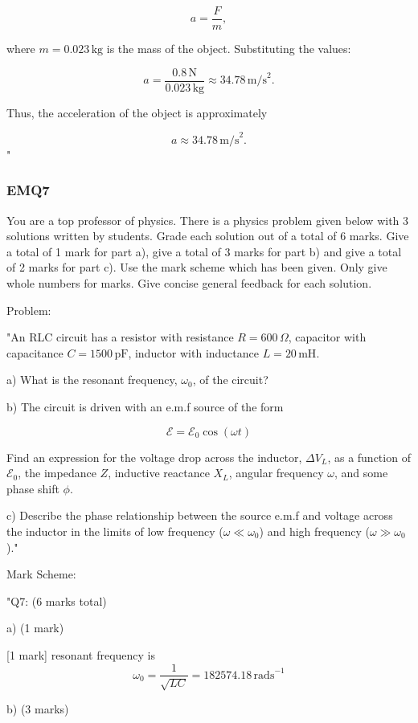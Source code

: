 \[
a = \frac{F}{m},
\]

where $m = 0.023 \, \text{kg}$ is the mass of the object. Substituting the values:

\[
a = \frac{0.8 \, \text{N}}{0.023 \, \text{kg}} \approx 34.78 \, \text{m/s}^2.
\]

Thus, the acceleration of the object is approximately

\[
a \approx 34.78 \, \text{m/s}^2.
\]"

\subsubsection{EMQ7}

You are a top professor of physics. There is a physics problem given below with 3 solutions written by students. Grade each solution out of a total of 6 marks. Give a total of 1 mark for part a), give a total of 3 marks for part b) and give a total of 2 marks for part c). Use the mark scheme which has been given. Only give whole numbers for marks. Give concise general feedback for each solution. 

Problem:

"An RLC circuit has a resistor with resistance \( R = 600 \, \Omega \), capacitor with capacitance \( C = 1500 \, \text{pF} \), inductor with inductance \( L = 20 \, \text{mH} \).

a) What is the resonant frequency, \( \omega_{0} \), of the circuit?

b) The circuit is driven with an e.m.f source of the form 

\[ \mathcal{E} = \mathcal{E}_{0} \cos(\omega t) \]

Find an expression for the voltage drop across the inductor, \( \Delta V_{L} \), as a function of \( \mathcal{E}_{0} \), the impedance \( Z \), inductive reactance \( X_{L} \), angular frequency \( \omega \), and some phase shift \( \phi \).

c) Describe the phase relationship between the source e.m.f and voltage across the inductor in the limits of low frequency (\( \omega \ll \omega_{0} \)) and high frequency (\( \omega \gg \omega_{0} \))."

Mark Scheme:

"{Q7: (6 marks total)}

a) (1 mark) 

[1 mark]  resonant frequency is 
\[ \omega_0 = \frac{1}{\sqrt{LC}} = 182574.18 \, \mathrm{rads}^{-1} \]

b) (3 marks)

